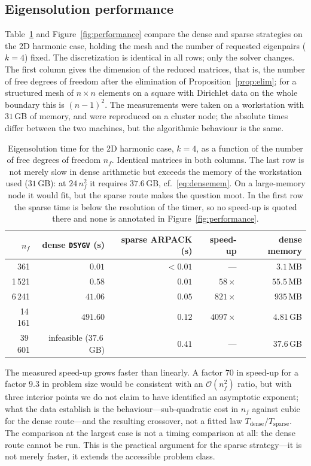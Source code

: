 \documentclass[pdflatex,sn-mathphys-num]{sn-jnl}
\theoremstyle{thmstyleone}%
\theoremstyle{thmstyletwo}%
\theoremstyle{thmstylethree}%
\begin{document}
\subsection{Eigensolution performance}\label{sec:performance}

Table~\ref{tab:performance} and Figure~\ref{fig:performance} compare the dense
and sparse strategies on the 2D harmonic case, holding the mesh and the number
of requested eigenpairs ($k = 4$) fixed. The discretization is identical in all
rows; only the solver changes. The first column gives the dimension of the
reduced matrices, that is, the number of free degrees of freedom after the
elimination of Proposition~\ref{prop:elim}; for a structured mesh of
$n\times n$ elements on a square with Dirichlet data on the whole boundary this
is $(n-1)^2$. The measurements were taken on a workstation with $31$\,GB of
memory, and were reproduced on a cluster node; the absolute times differ between
the two machines, but the algorithmic behaviour is the same.

\begin{table}[t]
\caption{Eigensolution time for the 2D harmonic case, $k = 4$, as a function of
the number of free degrees of freedom $n_f$. Identical matrices in both columns.
The last row is not merely slow in dense arithmetic but exceeds the memory of the
workstation used ($31$\,GB): at $24\,n_f^2$ it requires $37.6$\,GB, cf.\
\eqref{eq:densemem}. On a large-memory node it would fit, but the sparse route
makes the question moot. In the first row the sparse time is below the resolution
of the timer, so no speed-up is quoted there and none is annotated in
Figure~\ref{fig:performance}.}\label{tab:performance}
\begin{tabular}{@{}rrrrr@{}}
\toprule
$n_f$ & dense \texttt{DSYGV} (s) & sparse ARPACK (s) & speed-up & dense memory \\
\midrule
361   & $0.01$   & $<0.01$ & --- & $3.1$\,MB \\
1\,521 & $0.58$   & $0.01$  & $58\times$ & $55.5$\,MB \\
6\,241 & $41.06$  & $0.05$  & $821\times$ & $935$\,MB \\
14\,161 & $491.60$ & $0.12$  & $4097\times$ & $4.81$\,GB \\
39\,601 & infeasible ($37.6$\,GB) & $0.41$ & --- & $37.6$\,GB \\
\bottomrule
\end{tabular}
\end{table}

The measured speed-up grows faster than linearly. A factor $70$ in speed-up for
a factor $9.3$ in problem size would be consistent with an $\mathcal{O}(n_f^2)$
ratio, but with three interior points we do not claim to have identified an
asymptotic exponent; what the data establish is the behaviour---sub-quadratic
cost in $n_f$ against cubic for the dense route---and the resulting crossover,
not a fitted law
$T_{\text{dense}}/T_{\text{sparse}}$. The comparison at the largest case is not a
timing comparison at all: the dense route cannot be run. This is the practical
argument for the sparse strategy---it is not merely faster, it extends the
accessible problem class.
\end{document}
